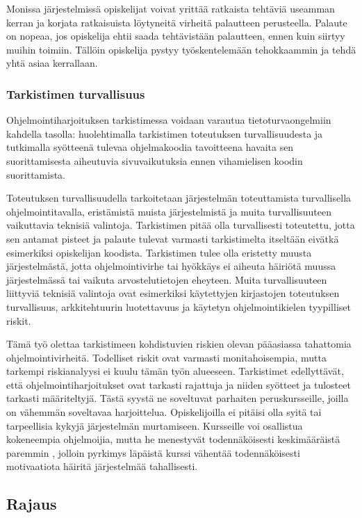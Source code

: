 Monissa järjestelmissä opiskelijat voivat yrittää ratkaista tehtäviä useamman
kerran ja korjata ratkaisuista löytyneitä virheitä palautteen perusteella.
Palaute on nopeaa, jos opiskelija ehtii saada tehtävistään palautteen, ennen
kuin siirtyy muihin toimiin. Tällöin opiskelija pystyy työskentelemään
tehokkaammin ja tehdä yhtä asiaa kerrallaan.

\subsubsection{Tarkistimen turvallisuus}

Ohjelmointiharjoituksen tarkistimessa voidaan varautua tietoturvaongelmiin
kahdella tasolla: huolehtimalla tarkistimen toteutuksen turvallisuudesta ja
tutkimalla syötteenä tulevaa ohjelmakoodia tavoitteena havaita sen
suorittamisesta aiheutuvia sivuvaikutuksia ennen vihamielisen koodin
suorittamista.

Toteutuksen turvallisuudella tarkoitetaan järjestelmän toteuttamista
turvallisella ohjelmointitavalla, eristämistä muista järjestelmistä ja
muita turvallisuuteen vaikuttavia teknisiä valintoja.
Tarkistimen pitää olla turvallisesti toteutettu, jotta sen antamat pisteet ja
palaute tulevat varmasti tarkistimelta itseltään eivätkä esimerkiksi opiskelijan
koodista. Tarkistimen tulee olla eristetty muusta järjestelmästä, jotta
ohjelmointivirhe tai hyökkäys ei aiheuta häiriötä muussa järjestelmässä tai
vaikuta arvostelutietojen eheyteen. Muita turvallisuuteen liittyviä teknisiä
valintoja ovat esimerkiksi käytettyjen kirjastojen toteutuksen turvallisuus,
arkkitehtuurin luotettavuus ja käytetyn ohjelmointikielen tyypilliset riskit.

Tämä työ olettaa tarkistimeen kohdistuvien riskien olevan pääasiassa
tahattomia ohjelmointivirheitä. Todelliset riskit ovat varmasti
monitahoisempia, mutta tarkempi riskianalyysi ei kuulu tämän työn alueeseen.
Tarkistimet edellyttävät, että ohjelmointiharjoitukset ovat tarkasti rajattuja
ja niiden syötteet ja tulosteet tarkasti määriteltyjä. Tästä syystä ne
soveltuvat parhaiten peruskursseille, joilla on vähemmän soveltavaa
harjoittelua. Opiskelijoilla ei pitäisi olla syitä tai tarpeellisia kykyjä
järjestelmän murtamiseen. Kursseille voi osallistua kokeneempia ohjelmoijia,
mutta he menestyvät todennäköisesti keskimääräistä paremmin
\citep{hagan2000does}, jolloin pyrkimys läpäistä kurssi vähentää
todennäköisesti motivaatiota häiritä järjestelmää tahallisesti.

\subsection{Rajaus}

